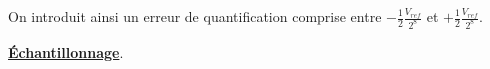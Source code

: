 \documentclass{article}
\begin{document}
On introduit ainsi un erreur de quantification comprise entre $-\frac{1}{2}\frac{V_{ref}}{2^8}$ et $+\frac{1}{2}\frac{V_{ref}}{2^8}$.



\noindent \textbf{\underline{Échantillonnage}}.

%
\end{document}
